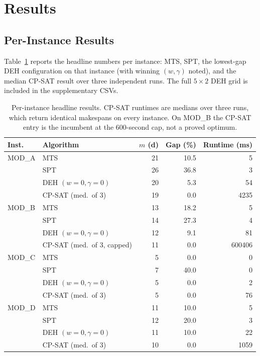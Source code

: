 \documentclass[conference]{IEEEtran}
\begin{document}
\section{Results}
\label{sec:results}

\subsection{Per-Instance Results}
\label{sec:per-instance-results}

Table~\ref{tab:per-instance} reports the headline numbers per
instance: MTS, SPT, the lowest-gap DEH configuration on
that instance (with winning $(w, \gamma)$ noted), and the median
CP-SAT result over three independent runs. The full $5 \times 2$
DEH grid is included in the supplementary CSVs.

\begin{table}[ht]
\caption{Per-instance headline results. CP-SAT runtimes are medians
over three runs, which return identical makespans on every instance.
On MOD\_B the CP-SAT entry is the incumbent at the 600-second cap,
not a proved optimum.}
\label{tab:per-instance}
\centering
\renewcommand{\arraystretch}{1.15}
\setlength{\tabcolsep}{3pt}
\footnotesize
\begin{tabular}{@{}llrrr@{}}
\toprule
Inst.\ & Algorithm                        & $m$ (d) & Gap (\%) & Runtime (ms) \\
\midrule
MOD\_A & MTS                            & 21 & 10.5 & 5    \\
       & SPT                            & 26 & 36.8 & 3    \\
       & DEH $(w{=}0, \gamma{=}0)$      & 20 &  5.3 & 54   \\
       & CP-SAT (med.\ of 3)             & 19 &  0.0 & 4235 \\
\midrule
MOD\_B & MTS                            & 13 & 18.2 & 5      \\
       & SPT                            & 14 & 27.3 & 4      \\
       & DEH $(w{=}0, \gamma{=}0)$      & 12 &  9.1 & 81     \\
       & CP-SAT (med.\ of 3, capped)     & 11 &  0.0 & 600406 \\
\midrule
MOD\_C & MTS                            &  5 &  0.0 & 0    \\
       & SPT                            &  7 & 40.0 & 0    \\
       & DEH $(w{=}0, \gamma{=}0)$      &  5 &  0.0 & 2    \\
       & CP-SAT (med.\ of 3)             &  5 &  0.0 & 76   \\
\midrule
MOD\_D & MTS                            & 11 & 10.0 & 5    \\
       & SPT                            & 12 & 20.0 & 3    \\
       & DEH $(w{=}0, \gamma{=}0)$      & 11 & 10.0 & 22   \\
       & CP-SAT (med.\ of 3)             & 10 &  0.0 & 1059 \\
\bottomrule
\end{tabular}
\end{table}
\end{document}
